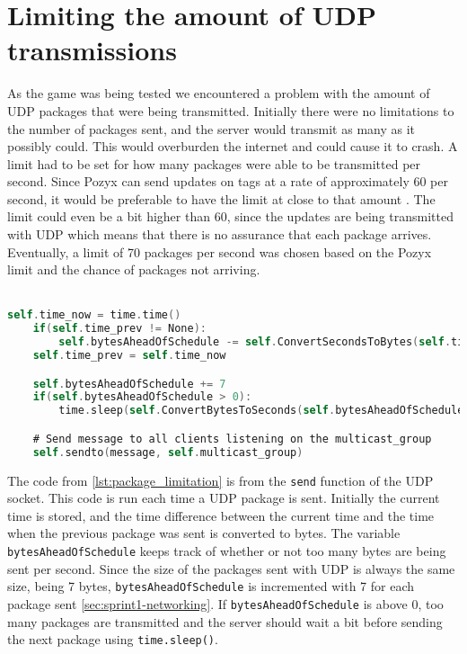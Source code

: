 \section{Limiting the amount of UDP transmissions}\label{sec:sprint5-transmissionlimit}
As the game was being tested we encountered a problem with the amount of UDP packages that were being transmitted.
Initially there were no limitations to the number of packages sent, and the server would transmit as many as it possibly could.
This would overburden the internet and could cause it to crash.
A limit had to be set for how many packages were able to be transmitted per second.
Since Pozyx can send updates on tags at a rate of approximately 60 per second, it would be preferable to have the limit at close to that amount \cite{pozyx-Performance}.
The limit could even be a bit higher than 60, since the updates are being transmitted with UDP which means that there is no assurance that each package arrives.
Eventually, a limit of 70 packages per second was chosen based on the Pozyx limit and the chance of packages not arriving.
\\\\
\begin{lstlisting}[caption={Implementaion of the limit on the amount of packages that can be sent per second}, captionpos=b,language=C,label={lst:package_limitation}]
    self.time_now = time.time()
    if(self.time_prev != None):
        self.bytesAheadOfSchedule -= self.ConvertSecondsToBytes(self.time_now - self.time_prev)
    self.time_prev = self.time_now

    self.bytesAheadOfSchedule += 7
    if(self.bytesAheadOfSchedule > 0):
        time.sleep(self.ConvertBytesToSeconds(self.bytesAheadOfSchedule))

    # Send message to all clients listening on the multicast_group
    self.sendto(message, self.multicast_group)
\end{lstlisting}
The code from \autoref{lst:package_limitation} is from the \texttt{send} function of the UDP socket.
This code is run each time a UDP package is sent.
Initially the current time is stored, and the time difference between the current time and the time when the previous package was sent is converted to bytes.
The variable \texttt{bytesAheadOfSchedule} keeps track of whether or not too many bytes are being sent per second.
Since the size of the packages sent with UDP is always the same size, being 7 bytes, \texttt{bytesAheadOfSchedule} is incremented with 7 for each package sent \autoref{sec:sprint1-networking}.
If \texttt{bytesAheadOfSchedule} is above 0, too many packages are transmitted and the server should wait a bit before sending the next package using \texttt{time.sleep()}.
